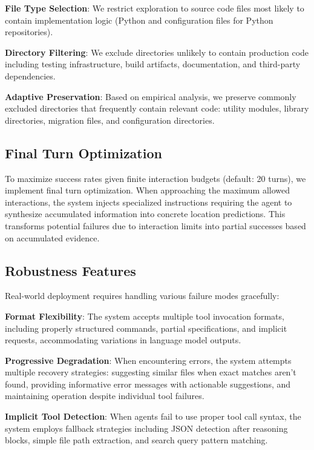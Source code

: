 \documentclass[11pt]{article}
\begin{document}
\textbf{File Type Selection}: We restrict exploration to source code files most likely to contain implementation logic (Python and configuration files for Python repositories).

\textbf{Directory Filtering}: We exclude directories unlikely to contain production code including testing infrastructure, build artifacts, documentation, and third-party dependencies.

\textbf{Adaptive Preservation}: Based on empirical analysis, we preserve commonly excluded directories that frequently contain relevant code: utility modules, library directories, migration files, and configuration directories.

\subsection{Final Turn Optimization}

To maximize success rates given finite interaction budgets (default: 20 turns), we implement final turn optimization. When approaching the maximum allowed interactions, the system injects specialized instructions requiring the agent to synthesize accumulated information into concrete location predictions. This transforms potential failures due to interaction limits into partial successes based on accumulated evidence.

\subsection{Robustness Features}

Real-world deployment requires handling various failure modes gracefully:

\textbf{Format Flexibility}: The system accepts multiple tool invocation formats, including properly structured commands, partial specifications, and implicit requests, accommodating variations in language model outputs.

\textbf{Progressive Degradation}: When encountering errors, the system attempts multiple recovery strategies: suggesting similar files when exact matches aren't found, providing informative error messages with actionable suggestions, and maintaining operation despite individual tool failures.

\textbf{Implicit Tool Detection}: When agents fail to use proper tool call syntax, the system employs fallback strategies including JSON detection after reasoning blocks, simple file path extraction, and search query pattern matching.
\end{document}
